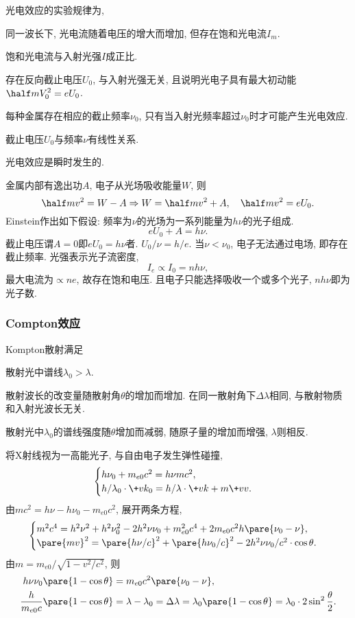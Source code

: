\documentclass{ctexart}
\begin{document}
光电效应的实验规律为,
\begin{cenum}
    \item 同一波长下, 光电流随着电压的增大而增加, 但存在饱和光电流$I_m$.
    \item 饱和光电流与入射光强$I$成正比.
    \item 存在反向截止电压$U_0$, 与入射光强无关, 且说明光电子具有最大初动能$\displaystyle \half mV_0^2 = eU_0$.
    \item 每种金属存在相应的截止频率$\nu_0$, 只有当入射光频率超过$\nu_0$时才可能产生光电效应.
    \item 截止电压$U_0$与频率$\nu$有线性关系.
    \item 光电效应是瞬时发生的.
\end{cenum}
金属内部有逸出功$A$, 电子从光场吸收能量$W$, 则
\[ \half mv^2 = W - A \Rightarrow W = \half mv^2 + A,\quad \half mv^2 = eU_0. \]
Einstein作出如下假设: 频率为$\nu$的光场为一系列能量为$h\nu$的光子组成.
\[ eU_0 + A = h\nu. \]
截止电压谓$A = 0$即$eU_0 = h\nu$者. $U_0/\nu = h/e$. 当$\nu<\nu_0$, 电子无法通过电场, 即存在截止频率. 光强表示光子流密度,
\[ I_e \propto I_0 = nh\nu, \]
最大电流为$\propto ne$, 故存在饱和电压. 且电子只能选择吸收一个或多个光子, $nh\nu$即为光子数.

\subsubsection{Compton效应} %
\label{ssub:compton效应}

Kompton散射满足
\begin{cenum}
    \item 散射光中谱线$\lambda_0>\lambda$.
    \item 散射波长的改变量随散射角$\theta$的增加而增加. 在同一散射角下$\Delta \lambda$相同, 与散射物质和入射光波长无关.
    \item 散射光中$\lambda_0$的谱线强度随$\theta$增加而减弱, 随原子量的增加而增强, $\lambda$则相反.
\end{cenum}
将X射线视为一高能光子, 与自由电子发生弹性碰撞,
\[ \begin{cases}
    h\nu_0 + m_{e0}c^2 = h\nu mc^2, \\
    h/\lambda_0 \cdot \+vk_0 = h/\lambda\cdot \+vk + m\+vv.
\end{cases} \]
由$mc^2 = h\nu - h\nu_0 - m_{e0}c^2$, 展开两条方程,
\[ \begin{cases}
    m^2c^4 = h^2\nu^2 + h^2\nu_0^2 - 2h^2\nu\nu_0 + m^2_{e0}c^4 + 2m_{e0}c^2h\pare{\nu_0 - \nu}, \\
    \pare{mv}^2 = \pare{h\nu/c}^2 + \pare{h\nu_0/c}^2 - 2h^2\nu\nu_0/c^2\cdot\cos\theta.
\end{cases} \]
由$m = m_{e0}/\sqrt{1-v^2/c^2}$, 则
\begin{align*}
    h\nu\nu_0\pare{1-\cos\theta} &= m_{e0}c^2\pare{\nu_0 - \nu}, \\
    \frac{h}{m_{e0}c}\pare{1-\cos\theta} &= \lambda - \lambda_0 = \Delta \lambda = \lambda_0\pare{1-\cos\theta} = \lambda_0\cdot 2\sin^2 \frac{\theta}{2}.
\end{align*}
\end{document}
